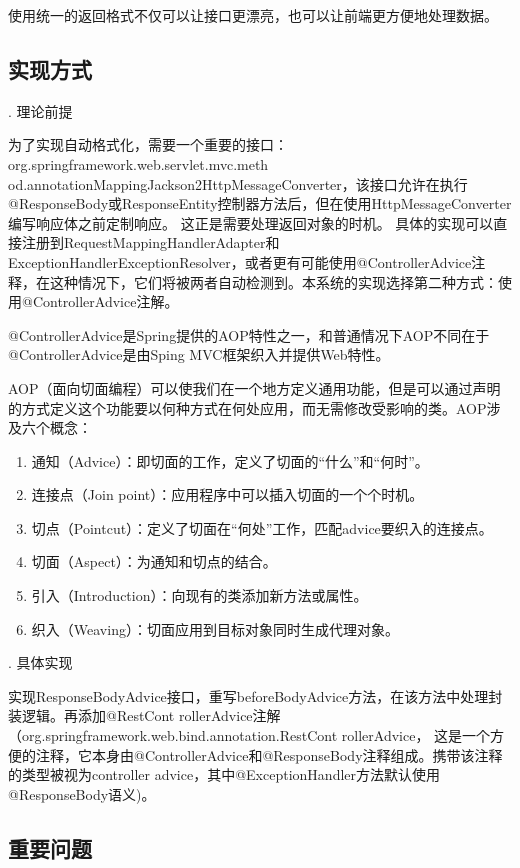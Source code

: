 使用统一的返回格式不仅可以让接口更漂亮，也可以让前端更方便地处理数据。

\subsection{实现方式}

. 理论前提

为了实现自动格式化，需要一个重要的接口： org.springframework.web.servlet.mvc.meth od.annotationMappingJackson2HttpMessageConverter，该接口允许在执行@ResponseBody或ResponseEntity控制器方法后，但在使用HttpMessageConverter编写响应体之前定制响应。 这正是需要处理返回对象的时机。
具体的实现可以直接注册到RequestMappingHandlerAdapter和ExceptionHandlerExceptionResolver，或者更有可能使用@ControllerAdvice注释，在这种情况下，它们将被两者自动检测到。本系统的实现选择第二种方式：使用@ControllerAdvice注解。

@ControllerAdvice是Spring提供的AOP特性之一，和普通情况下AOP不同在于@ControllerAdvice是由Sping MVC框架织入并提供Web特性。

AOP（面向切面编程）可以使我们在一个地方定义通用功能，但是可以通过声明的方式定义这个功能要以何种方式在何处应用，而无需修改受影响的类\cite{.SpringInAction}。AOP涉及六个概念：
\begin{enumerate}
  \item 通知（Advice）：即切面的工作，定义了切面的“什么”和“何时”。
  \item 连接点（Join point）：应用程序中可以插入切面的一个个时机。
  \item 切点（Pointcut）：定义了切面在“何处”工作，匹配advice要织入的连接点。
  \item 切面（Aspect）：为通知和切点的结合。
  \item 引入（Introduction）：向现有的类添加新方法或属性。
  \item 织入（Weaving）：切面应用到目标对象同时生成代理对象。
\end{enumerate}

. 具体实现

实现ResponseBodyAdvice接口，重写beforeBodyAdvice方法，在该方法中处理封装逻辑。再添加@RestCont rollerAdvice注解（org.springframework.web.bind.annotation.RestCont rollerAdvice，
这是一个方便的注释，它本身由@ControllerAdvice和@ResponseBody注释组成。携带该注释的类型被视为controller advice，其中@ExceptionHandler方法默认使用@ResponseBody语义)。

\subsection{重要问题}

